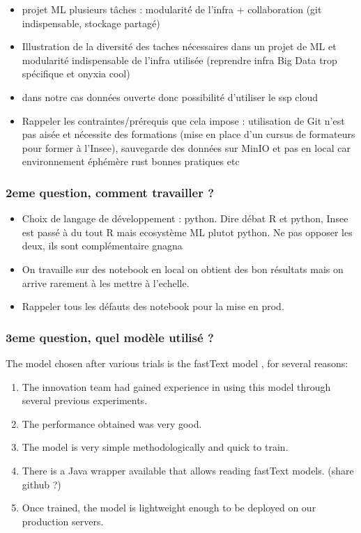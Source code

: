 \begin{itemize}

    \item projet ML plusieurs tâches : modularité de l'infra + collaboration (git indispensable, stockage partagé)
    \item Illustration de la diversité des taches nécessaires dans un projet de ML et modularité indispensable de l'infra utilisée (reprendre infra Big Data trop spécifique et onyxia cool)
    \item dans notre cas données ouverte donc possibilité d'utiliser le ssp cloud
    \item Rappeler les contraintes/prérequis que cela impose : utilisation de Git n'est pas aisée et nécessite des formations (mise en place d'un cursus de formateurs pour former à l'Insee), sauvegarde des données sur MinIO et pas en  local car environnement éphémère
    rust bonnes pratiques etc
\end{itemize}

\subsubsection{2eme question, comment travailler ?}
\begin{itemize}
    \item Choix de langage de développement : python. Dire débat R et python, Insee est passé à du tout R mais ecosystème ML plutot python. Ne pas opposer les deux, ils sont complémentaire gnagna
    \item On travaille sur des notebook en local on obtient des bon résultats mais on arrive rarement à les mettre à l'echelle. 
    \item Rappeler tous les défauts des notebook pour la mise en prod. 
\end{itemize}


\subsubsection{3eme question, quel modèle utilisé ?}

The model chosen after various trials is the fastText model \cite{joulin2016bag}, for several reasons:

\begin{enumerate}
    \item The innovation team had gained experience in using this model through several previous experiments.
    \item The performance obtained was very good.
    \item The model is very simple methodologically and quick to train.
    \item There is a Java wrapper available that allows reading fastText models. (share github ?)
    \item Once trained, the model is lightweight enough to be deployed on our production servers.
\end{enumerate}


